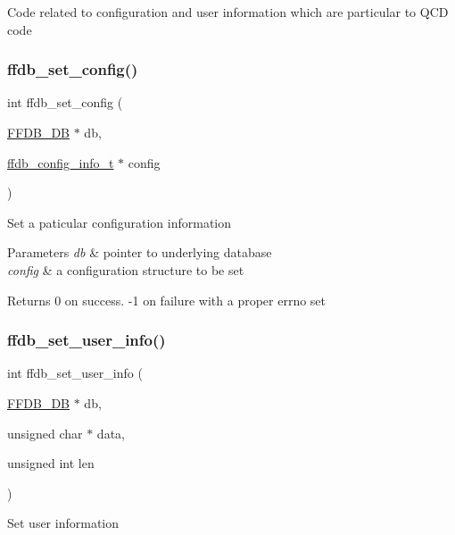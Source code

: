 Code related to configuration and user information which are particular to Q\+CD code \mbox{\label{adat-devel_2other__libs_2filedb_2filehash_2ffdb__hash_8c_ae36e14bba7052f0de66a7b5d1308f9ba}} 
\subsubsection{\texorpdfstring{ffdb\_set\_config()}{ffdb\_set\_config()}}
{\footnotesize\ttfamily int ffdb\+\_\+set\+\_\+config (\begin{DoxyParamCaption}\item[{\mbox{\hyperlink{adat-devel_2other__libs_2filedb_2filehash_2ffdb__db_8h_a0b27b956926453a7a8141ea8e10f0df8}{F\+F\+D\+B\+\_\+\+DB}} $\ast$}]{db,  }\item[{\mbox{\hyperlink{adat-devel_2other__libs_2filedb_2filehash_2ffdb__db_8h_acc961fbd2faf6a849a1620309100fda1}{ffdb\+\_\+config\+\_\+info\+\_\+t}} $\ast$}]{config }\end{DoxyParamCaption})}

Set a paticular configuration information


\begin{DoxyParams}{Parameters}
{\em db} & pointer to underlying database \\
\hline
{\em config} & a configuration structure to be set\\
\hline
\end{DoxyParams}
\begin{DoxyReturn}{Returns}
0 on success. -\/1 on failure with a proper errno set 
\end{DoxyReturn}
\mbox{\label{adat-devel_2other__libs_2filedb_2filehash_2ffdb__hash_8c_aa9be22f501b0567050accbc8c9026c11}} 
\subsubsection{\texorpdfstring{ffdb\_set\_user\_info()}{ffdb\_set\_user\_info()}}
{\footnotesize\ttfamily int ffdb\+\_\+set\+\_\+user\+\_\+info (\begin{DoxyParamCaption}\item[{\mbox{\hyperlink{adat-devel_2other__libs_2filedb_2filehash_2ffdb__db_8h_a0b27b956926453a7a8141ea8e10f0df8}{F\+F\+D\+B\+\_\+\+DB}} $\ast$}]{db,  }\item[{unsigned char $\ast$}]{data,  }\item[{unsigned int}]{len }\end{DoxyParamCaption})}

Set user information 
